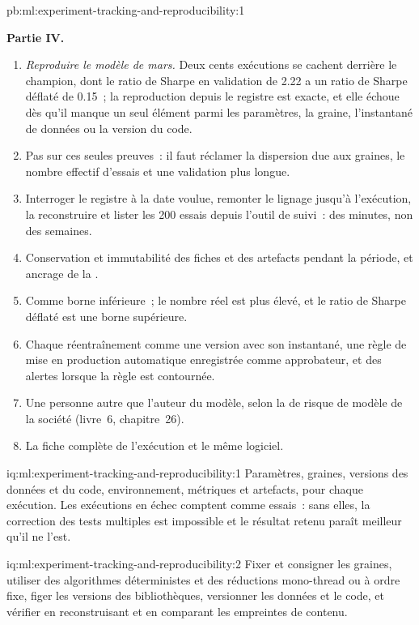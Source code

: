 \begin{solution}{pb:ml:experiment-tracking-and-reproducibility:1}
\begin{enumerate}[resume]
\end{enumerate}
\textbf{Partie IV.}
\begin{enumerate}[resume]
\item \emph{Reproduire le modèle de mars.} Deux cents exécutions se cachent derrière le champion, dont le ratio de Sharpe en validation de 2.22 a un
ratio de Sharpe déflaté de 0.15~; la reproduction depuis le registre est exacte, et elle échoue dès qu'il manque un seul élément parmi les paramètres, la graine, l'instantané de données
ou la version du code.
\item Pas sur ces seules preuves~: il faut réclamer la dispersion due aux graines, le nombre effectif d'essais et une validation plus longue.
\item Interroger le registre à la date voulue, remonter le lignage jusqu'à l'exécution, la reconstruire et lister les 200 essais depuis l'outil de suivi~:
des minutes, non des semaines.
\item Conservation et immutabilité des fiches et des artefacts pendant la période, et ancrage de la .
\item Comme borne inférieure~; le nombre réel est plus élevé, et le ratio de Sharpe déflaté est une borne supérieure.
\item Chaque réentraînement comme une version avec son instantané, une règle de mise en production automatique enregistrée comme approbateur, et des alertes lorsque la
règle est contournée.
\item Une personne autre que l'auteur du modèle, selon la  de risque de modèle de la société (livre~6, chapitre~26).
\item La fiche complète de l'exécution et le même logiciel.
\end{enumerate}
\end{solution}

\begin{solution}{iq:ml:experiment-tracking-and-reproducibility:1}
Paramètres, graines, versions des données et du code, environnement, métriques et artefacts, pour chaque exécution. Les exécutions en échec comptent comme essais~: sans
elles, la correction des tests multiples est impossible et le résultat retenu paraît meilleur qu'il ne l'est.
\end{solution}

\begin{solution}{iq:ml:experiment-tracking-and-reproducibility:2}
Fixer et consigner les graines, utiliser des algorithmes déterministes et des réductions mono-thread ou à ordre fixe, figer les versions des bibliothèques, versionner
les données et le code, et vérifier en reconstruisant et en comparant les empreintes de contenu.
\end{solution}

